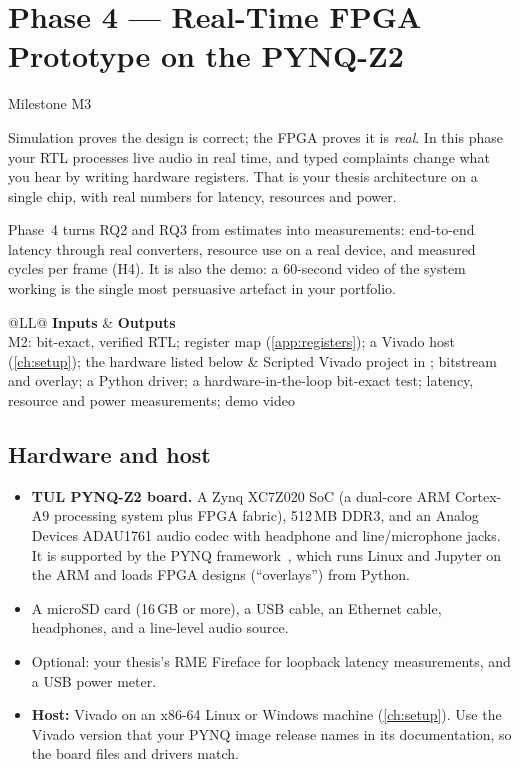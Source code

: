 \chapter{Phase 4 --- Real-Time FPGA Prototype on the PYNQ-Z2}\label{ch:fpga}

 \quad Milestone M3

Simulation proves the design is correct; the FPGA proves it is \emph{real}. In
this phase your RTL processes live audio in real time, and typed complaints
change what you hear by writing hardware registers. That is your thesis
architecture on a single chip, with real numbers for latency, resources and
power.

\begin{whybox}
Phase~4 turns RQ2 and RQ3 from estimates into measurements: end-to-end latency
through real converters, resource use on a real device, and measured cycles per
frame (H4). It is also the demo: a 60-second video of the system working is the
single most persuasive artefact in your portfolio.
\end{whybox}

\begin{center}\small
\begin{tabularx}{\textwidth}{@{}LL@{}}
\toprule
\textbf{Inputs} & \textbf{Outputs} \\
\midrule
M2: bit-exact, verified RTL; register map (\cref{app:registers}); a Vivado
host (\cref{ch:setup}); the hardware listed below
& Scripted Vivado project in ; bitstream and overlay; a
Python driver; a hardware-in-the-loop bit-exact test; latency, resource and
power measurements; demo video \\
\bottomrule
\end{tabularx}
\end{center}

\section{Hardware and host}\label{sec:fpga:hw}

\begin{itemize}
  \item \textbf{TUL PYNQ-Z2 board.} A Zynq XC7Z020 SoC (a dual-core ARM
  Cortex-A9 processing system plus FPGA fabric), 512\,MB DDR3, and an Analog
  Devices ADAU1761 audio codec with headphone and line/microphone jacks. It is
  supported by the PYNQ framework~\cite{pynq,ch12-13:pynqdocs}, which runs
  Linux and Jupyter on the ARM and loads FPGA designs (\enquote{overlays}) from
  Python.
  \item A microSD card (16\,GB or more), a USB cable, an Ethernet cable,
        headphones, and a line-level audio source.
  \item Optional: your thesis's RME Fireface for loopback latency measurements,
        and a USB power meter.
  \item \textbf{Host:} Vivado on an x86-64 Linux or Windows machine
        (\cref{ch:setup}). Use the Vivado version that your PYNQ image release
        names in its documentation, so the board files and drivers match.
\end{itemize}

